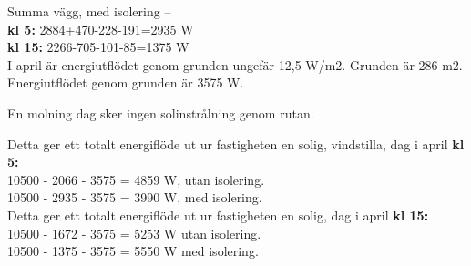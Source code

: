 Summa vägg, med isolering –\\
\textbf{kl 5:} 2884+470-228-191=2935 W\\
\textbf{kl 15:} 2266-705-101-85=1375 W\\

I april är energiutflödet genom grunden ungefär 12,5 W/m2. Grunden är 286 m2.\\
Energiutflödet genom grunden är 3575 W.

En molning dag sker ingen solinstrålning genom rutan.

Detta ger ett totalt energiflöde ut ur fastigheten en solig, vindstilla, dag i april \textbf{kl 5:}\\
10500 - 2066 - 3575 =  4859 W, utan isolering.\\
10500 - 2935 - 3575 =  3990 W, med isolering.\\

Detta ger ett totalt energiflöde ut ur fastigheten en solig, dag i april \textbf{kl 15:}\\
10500 - 1672 - 3575 = 5253 W utan isolering.\\
10500 - 1375 - 3575  =  5550 W med isolering.\\

